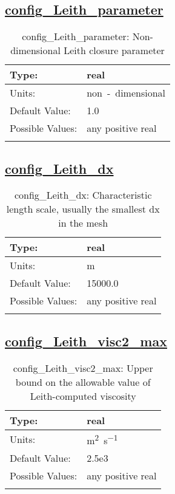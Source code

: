 \subsection[config\_Leith\_parameter]{\hyperref[sec:nm_tab_hmix_Leith]{config\_Leith\_parameter}}
\label{subsec:nm_sec_config_Leith_parameter}
\begin{center}
\begin{longtable}{| p{2.0in} || p{4.0in} |}
    \hline
    Type: & real \\
    \hline
    Units: & \si{non-dimensional} \\
    \hline
    Default Value: & 1.0 \\
    \hline
    Possible Values: & any positive real \\
    \hline
    \caption{config\_Leith\_parameter: Non-dimensional Leith closure parameter}
\end{longtable}
\end{center}
\subsection[config\_Leith\_dx]{\hyperref[sec:nm_tab_hmix_Leith]{config\_Leith\_dx}}
\label{subsec:nm_sec_config_Leith_dx}
\begin{center}
\begin{longtable}{| p{2.0in} || p{4.0in} |}
    \hline
    Type: & real \\
    \hline
    Units: & \si{m} \\
    \hline
    Default Value: & 15000.0 \\
    \hline
    Possible Values: & any positive real \\
    \hline
    \caption{config\_Leith\_dx: Characteristic length scale, usually the smallest dx in the mesh}
\end{longtable}
\end{center}
\subsection[config\_Leith\_visc2\_max]{\hyperref[sec:nm_tab_hmix_Leith]{config\_Leith\_visc2\_max}}
\label{subsec:nm_sec_config_Leith_visc2_max}
\begin{center}
\begin{longtable}{| p{2.0in} || p{4.0in} |}
    \hline
    Type: & real \\
    \hline
    Units: & \si{m^2.s^{-1}} \\
    \hline
    Default Value: & 2.5e3 \\
    \hline
    Possible Values: & any positive real \\
    \hline
    \caption{config\_Leith\_visc2\_max: Upper bound on the allowable value of Leith-computed viscosity}
\end{longtable}
\end{center}
